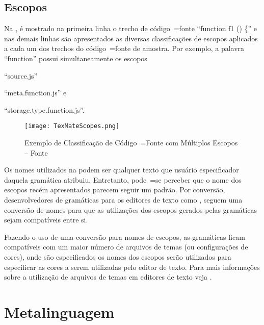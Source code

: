 \subsection{Escopos}

Na ,
é mostrado na primeira linha o trecho de código~=fonte ``function f1 () \{'' e
nas demais linhas são apresentados as diversas classificações de escopos aplicados a cada um dos trechos do código~=fonte de amostra.
Por exemplo,
a palavra ``function'' possui simultaneamente os escopos
\begin{inparaenum}[1)]
\item ``source.js''
\item ``meta.function.js'' e
\item ``storage.type.function.js''.
\end{inparaenum}
\begin{figure}[h]
\centering
\texttt{[image: TexMateScopes.png]}
\caption[Exemplo de Classificação de Código~=Fonte com Múltiplos Escopos]{Exemplo de Classificação de Código~=Fonte com Múltiplos Escopos -- Fonte }
\label{TexMateScopes}
\end{figure}

Os nomes utilizados na  podem ser qualquer texto que usuário especificador daquela gramática atribuiu.
Entretanto,
pode~=se perceber que o nome dos escopos recém apresentados parecem seguir um padrão.
Por conversão,
desenvolvedores de gramáticas para os editores de texto como ,
seguem uma conversão de nomes para que as utilizações dos escopos gerados pelas gramáticas sejam compatíveis entre si.

Fazendo o uso de uma conversão para nomes de escopos,
as gramáticas ficam compatíveis com um maior número de arquivos de temas (ou configurações de cores),
onde são especificados os nomes dos escopos serão utilizados para especificar as cores a serem utilizadas pelo editor de texto.
Para mais informações sobre a utilização de arquivos de temas em editores de texto veja .


\section{Metalinguagem}
\label{metalinguagemGrammar}

